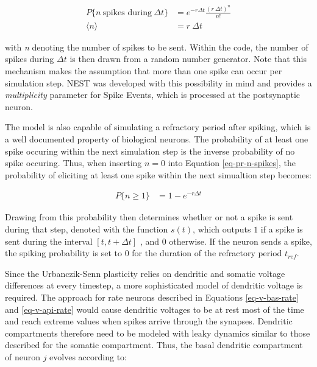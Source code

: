 \begin{align}
  P\{\textit{n} \ \text{spikes during} \ \Delta t\} & = e^{-r \Delta t} \frac{(r \ \Delta t) ^ n}{n!}\label{eq-pr-n-spikes} \\
  \langle \textit{n} \rangle                        & = r \ \Delta t
\end{align}


with \textit{n} denoting the number of spikes to be sent. Within the code, the number of spikes during $\Delta t$ is
then drawn from a random number generator. Note that this mechanism makes the assumption that more than one spike can
occur per simulation step. NEST was developed with this possibility in mind and provides a \textit{multiplicity}
parameter for Spike Events, which is processed at the postsynaptic neuron.

The model is also capable of simulating a refractory period after spiking, which is a well documented property of
biological neurons. The probability of at least one spike occuring within the next simulation step is the inverse
probability of no spike occuring. Thus, when inserting $n=0$ into Equation \ref{eq-pr-n-spikes}, the probability of
eliciting at least one spike within the next simualtion step becomes:

\begin{align}
  P\{ \textit{n} \geq 1\} & = 1 - e^{-r \Delta t}
\end{align}


Drawing from this probability then determines whether or not a spike is sent during that step, denoted with the function
$s(t)$, which outputs $1$ if a spike is sent during the interval $[t, t+\Delta t]$ , and $0$
otherwise. If the neuron sends a spike, the spiking probability is set to 0 for the duration of the refractory period
$t_{ref}$.\newline

Since the Urbanczik-Senn plasticity relies on dendritic and somatic voltage differences at every timestep, a more
sophisticated model of dendritic voltage is required. The approach for rate neurons described in Equations
\ref{eq-v-bas-rate} and \ref{eq-v-api-rate} would cause dendritic voltages to be at rest most of the time and reach
extreme values when spikes arrive through the synapses. Dendritic compartments therefore need to be modeled with leaky
dynamics similar to those described for the somatic compartment. Thus, the basal dendritic compartment of neuron $j$
evolves according to: 


